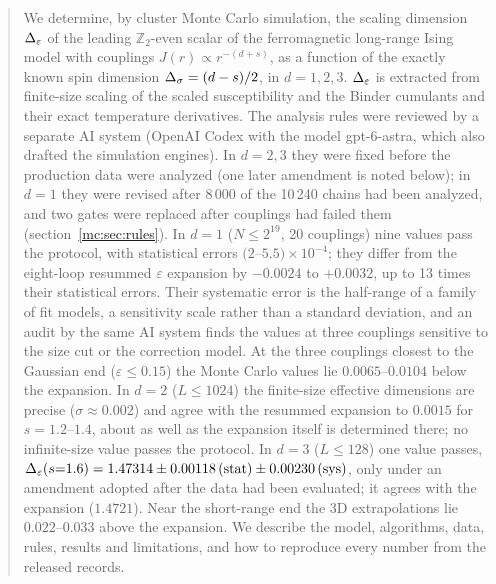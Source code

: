 


\begin{abstract}\noindent
We determine, by cluster Monte Carlo simulation, the scaling dimension $\De$ of the leading $\mathbb Z_2$-even scalar of the ferromagnetic
long-range Ising model with couplings $J(r)\propto r^{-(d+s)}$, as a function of the exactly known spin dimension $\Ds=(d-s)/2$, in $d=1,2,3$.
$\De$ is extracted from finite-size scaling of the scaled susceptibility and the Binder cumulants and their exact temperature derivatives.
The analysis rules were reviewed by a separate AI system (OpenAI Codex with the model gpt-6-astra, which also drafted the simulation
engines). In $d=2,3$ they were fixed before the production data were analyzed (one later
amendment is noted below); in $d=1$ they were revised after 8\,000 of the 10\,240 chains had been analyzed, and two gates were replaced after
couplings had failed them (section~\ref{mc:sec:rules}). In $d=1$ ($N\le2^{19}$, 20 couplings) nine values pass the protocol, with statistical errors
$(2$--$5.5)\times10^{-4}$; they differ from the eight-loop resummed $\varepsilon$ expansion by $-0.0024$ to $+0.0032$, up to 13 times their
statistical errors. Their systematic error is the half-range of a family of fit models, a sensitivity scale rather than a standard deviation,
and an audit by the same AI system finds the values at three couplings sensitive to the size cut or the correction model. At the three
couplings closest to the Gaussian end ($\varepsilon\le0.15$) the Monte Carlo values lie $0.0065$--$0.0104$ below the expansion. In $d=2$
($L\le1024$) the finite-size effective dimensions are precise ($\sigma\approx0.002$) and agree with the resummed expansion to $0.0015$ for
$s=1.2$--$1.4$, about as well as the expansion itself is determined there; no infinite-size value passes the protocol. In $d=3$ ($L\le128$) one
value passes, $\De(s{=}1.6)=1.47314\pm0.00118\,(\mathrm{stat})\pm0.00230\,(\mathrm{sys})$, only under an amendment adopted after the data had been
evaluated; it agrees with the expansion ($1.4721$). Near the short-range end the 3D extrapolations lie $0.022$--$0.033$ above the expansion.
We describe the model, algorithms, data, rules, results and limitations, and how to reproduce every number from the released records.
\end{abstract}


\clearpage

